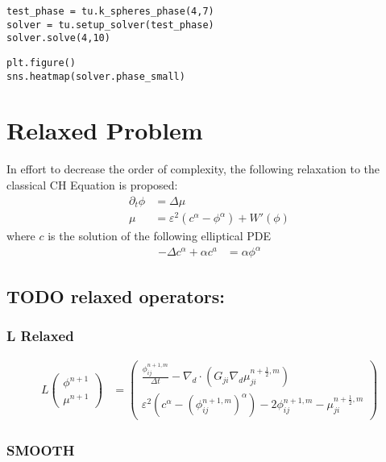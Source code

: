 \documentclass[11pt]{article}
\begin{document}
\begin{verbatim}
test_phase = tu.k_spheres_phase(4,7)
solver = tu.setup_solver(test_phase)
solver.solve(4,10)
\end{verbatim}

\begin{verbatim}
plt.figure()
sns.heatmap(solver.phase_small)
\end{verbatim}
\section{Relaxed Problem}
\label{sec:org24e0cd8}
In effort to decrease the order of complexity, the following relaxation to the classical CH Equation is proposed:
\begin{align*}
\partial_t \phi  &= \Delta \mu \\
\mu &= \varepsilon ^2(c^\alpha - \phi^\alpha) + W'(\phi)
\end{align*}
where \(c\) is the solution of the following elliptical PDE
\begin{align*}
- \Delta c^\alpha  + \alpha c^a &= \alpha \phi ^\alpha
\end{align*}
\subsection{{\bfseries\sffamily TODO} relaxed operators:}
\label{sec:org8087e9a}
\subsubsection{L Relaxed}
\label{sec:org93b82d1}
\begin{align*}
L
\begin{pmatrix}
\phi ^{n+1} \\
\mu^{n+1}
\end{pmatrix}
&=
\begin{pmatrix}
\frac{\phi^{n+1,m}_{ij}}{\Delta t} - \nabla _d \cdot (G_{ji} \nabla _d \mu^{n + \frac{1}{2},m}_{ji}) \\
\varepsilon ^2 (c^\alpha - (\phi^{n+1,m}_{ij})^\alpha) - 2\phi ^{n+1,m}_{ij} -\mu^{n + \frac{1}{2},m}_{ji}
\end{pmatrix}
\end{align*}
\subsubsection{SMOOTH}
\label{sec:org6e6768b}
\end{document}
